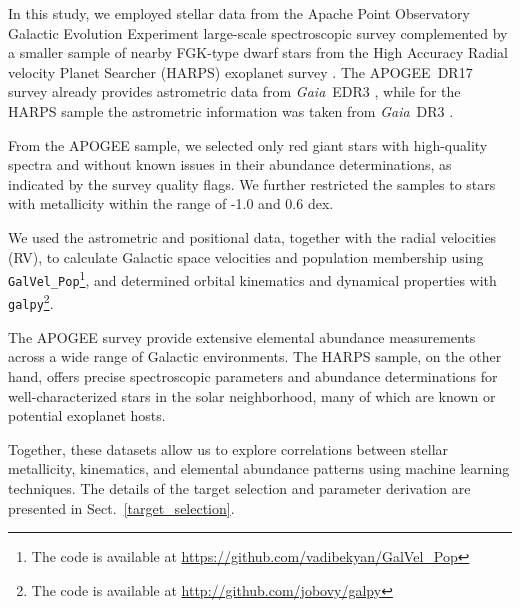 \documentclass{aa}
\begin{document}

In this study, we employed stellar data from the Apache Point Observatory Galactic Evolution Experiment \citep[APOGEE;][]{Abdurrouf-22} large-scale spectroscopic survey complemented by a smaller sample of nearby FGK-type dwarf stars from the High Accuracy Radial velocity Planet Searcher (HARPS) exoplanet survey \citep{Mayor-03, Adibekyan-12}. The APOGEE~DR17 survey already provides astrometric data from \textit{Gaia}~EDR3 \citep{Gaia-21}, while for the HARPS sample the astrometric information was taken from \textit{Gaia}~DR3 \citep{Gaia-23}.

From the APOGEE sample, we selected only red giant stars with high-quality spectra and without known issues in their abundance determinations, as indicated by the survey quality flags. We further restricted the samples to stars with metallicity within the range of -1.0  and 0.6 dex.

We used the astrometric and positional data, together with the radial velocities (RV), to calculate Galactic space velocities and population membership using \texttt{GalVel\_Pop}\footnote{The code is available at \url{https://github.com/vadibekyan/GalVel_Pop}}, and determined orbital kinematics and dynamical properties with \texttt{galpy}\footnote{The code is available at \url{http://github.com/jobovy/galpy}}.

The APOGEE survey provide extensive elemental abundance measurements across a wide range of Galactic environments. The HARPS sample, on the other hand, offers precise spectroscopic parameters and abundance determinations for well-characterized stars in the solar neighborhood, many of which are known or potential exoplanet hosts. 

Together, these datasets allow us to explore correlations between stellar metallicity, kinematics, and elemental abundance patterns using machine learning techniques. The details of the target selection and parameter derivation are presented in Sect.~\ref{target_selection}.
\end{document}

